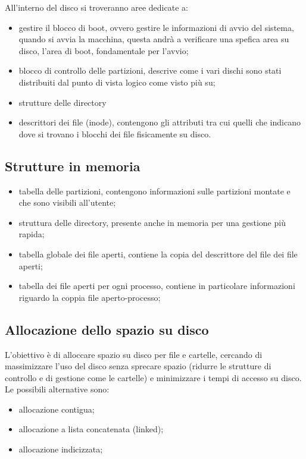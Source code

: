 \documentclass[a4paper, 12pt]{book}
\begin{document}
All'interno del disco si troveranno aree dedicate a:
\begin{itemize}
    \item gestire il blocco di boot, ovvero gestire le informazioni 
    di avvio del sistema, quando si avvia la macchina, questa 
    andrà a verificare una spefica area su disco, l'area di boot,
    fondamentale per l'avvio;
    \item blocco di controllo delle partizioni, descrive come i 
    vari dischi sono stati distribuiti dal punto di vista logico
    come visto più su;
    \item strutture delle directory
    \item descrittori dei file (inode), contengono gli attributi 
    tra cui quelli che indicano dove si trovano i blocchi dei file 
    fisicamente su disco.
\end{itemize}

\subsection{Strutture in memoria}

\begin{itemize}
    \item tabella delle partizioni, contengono informazioni 
    sulle partizioni montate e che sono visibili all'utente;
    \item struttura delle directory, presente anche in memoria 
    per una gestione più rapida;
    \item tabella globale dei file aperti, contiene la copia 
    del descrittore del file dei file aperti;
    \item tabella dei file aperti per ogni processo, contiene in particolare 
    informazioni riguardo la coppia file aperto-processo; 
\end{itemize}

\subsection{Allocazione dello spazio su disco}

L'obiettivo è di alloccare spazio su disco per file e cartelle, 
cercando di massimizzare l'uso del disco senza sprecare spazio 
(ridurre le strutture di controllo e di gestione come le cartelle)
e minimizzare i tempi di accesso su disco. Le possibili
alternative sono:
\begin{itemize}
    \item allocazione contigua;
    \item allocazione a lista concatenata (linked);
    \item allocazione indicizzata;
\end{itemize}
\end{document}
